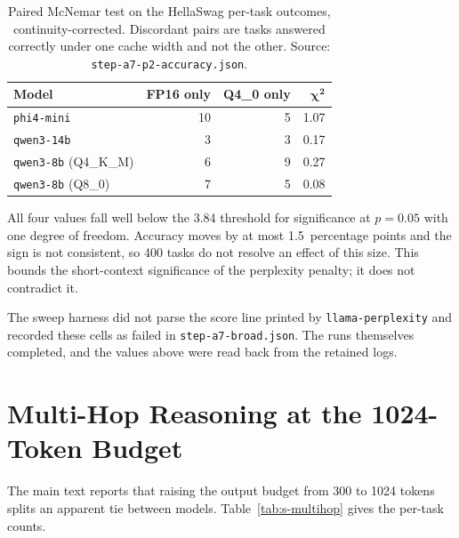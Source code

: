 \documentclass[11pt,a4paper]{article}
\begin{document}
\begin{table}[h]
\centering\small
\caption{Paired McNemar test on the HellaSwag per-task outcomes,
continuity-corrected.  Discordant pairs are tasks answered correctly
under one cache width and not the other.  Source:
\texttt{step-a7-p2-accuracy.json}.}
\label{tab:s-mcnemar}
\begin{tabular}{@{}lrrr@{}}
\toprule
\textbf{Model} & \textbf{FP16 only} & \textbf{Q4\_0 only} & $\boldsymbol{\chi^2}$ \\
\midrule
\texttt{phi4-mini}           & 10 &  5 & 1.07 \\
\texttt{qwen3-14b}           &  3 &  3 & 0.17 \\
\texttt{qwen3-8b} (Q4\_K\_M) &  6 &  9 & 0.27 \\
\texttt{qwen3-8b} (Q8\_0)    &  7 &  5 & 0.08 \\
\bottomrule
\end{tabular}
\end{table}

All four values fall well below the 3.84 threshold for significance at
$p=0.05$ with one degree of freedom.  Accuracy moves by at most
1.5~percentage points and the sign is not consistent, so 400 tasks do
not resolve an effect of this size.  This bounds the short-context
significance of the perplexity penalty; it does not contradict it.

The sweep harness did not parse the score line printed by
\texttt{llama-perplexity} and recorded these cells as failed in
\texttt{step-a7-broad.json}.  The runs themselves completed, and the
values above were read back from the retained logs.

\section{Multi-Hop Reasoning at the 1024-Token Budget}

The main text reports that raising the output budget from 300 to 1024
tokens splits an apparent tie between models.  Table~\ref{tab:s-multihop}
gives the per-task counts.
\end{document}
